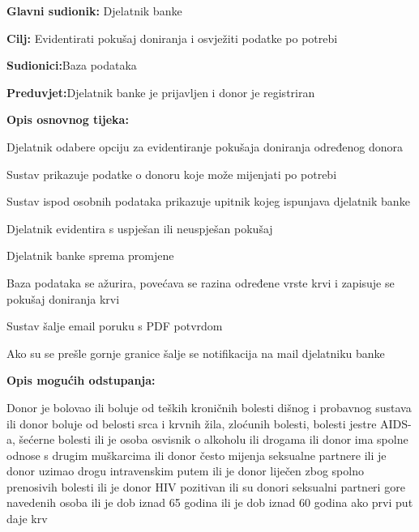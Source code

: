 \begin{packed_item}
	
	\item \textbf{Glavni sudionik: }{Djelatnik banke}
	\item  \textbf{Cilj:} {Evidentirati pokušaj doniranja i osvježiti podatke po potrebi}
	\item  \textbf{Sudionici:}{Baza podataka} 
	\item  \textbf{Preduvjet:}{Djelatnik banke je prijavljen i donor je registriran}
	\item  \textbf{Opis osnovnog tijeka:}
	
	\item[] \begin{packed_enum}
		
		\item {Djelatnik odabere opciju za evidentiranje pokušaja doniranja određenog donora}
		\item {Sustav prikazuje podatke o donoru koje može mijenjati po potrebi}
		\item {Sustav ispod osobnih podataka prikazuje upitnik kojeg ispunjava djelatnik banke}
		\item {Djelatnik evidentira s uspješan ili neuspješan pokušaj}
		\item {Djelatnik banke sprema promjene}
		\item {Baza podataka se ažurira, povećava se razina određene vrste krvi i zapisuje se pokušaj doniranja krvi}
		\item {Sustav šalje email poruku s PDF potvrdom}
		\item {Ako su se prešle gornje granice šalje se notifikacija na mail djelatniku banke}
	\end{packed_enum}
	\item  \textbf{Opis mogućih odstupanja:}
	
	\item[] \begin{packed_item}
		\item[4.a] {Donor je bolovao ili boluje od teških kroničnih bolesti dišnog i probavnog sustava ili donor boluje od belosti srca i krvnih žila, zloćunih bolesti, bolesti jestre AIDS-a, šećerne bolesti ili je osoba osvisnik o alkoholu ili drogama ili donor ima spolne odnose s drugim muškarcima ili donor često mijenja seksualne partnere ili je donor uzimao drogu intravenskim putem ili je donor liječen zbog spolno prenosivih bolesti ili je donor HIV pozitivan ili su donori seksualni partneri gore navedenih osoba ili je dob iznad 65 godina ili je dob iznad 60 godina ako prvi put daje krv}
		\item[] \begin{packed_enum}
			

\end{packed_enum}
\end{packed_item}
\end{packed_item}

